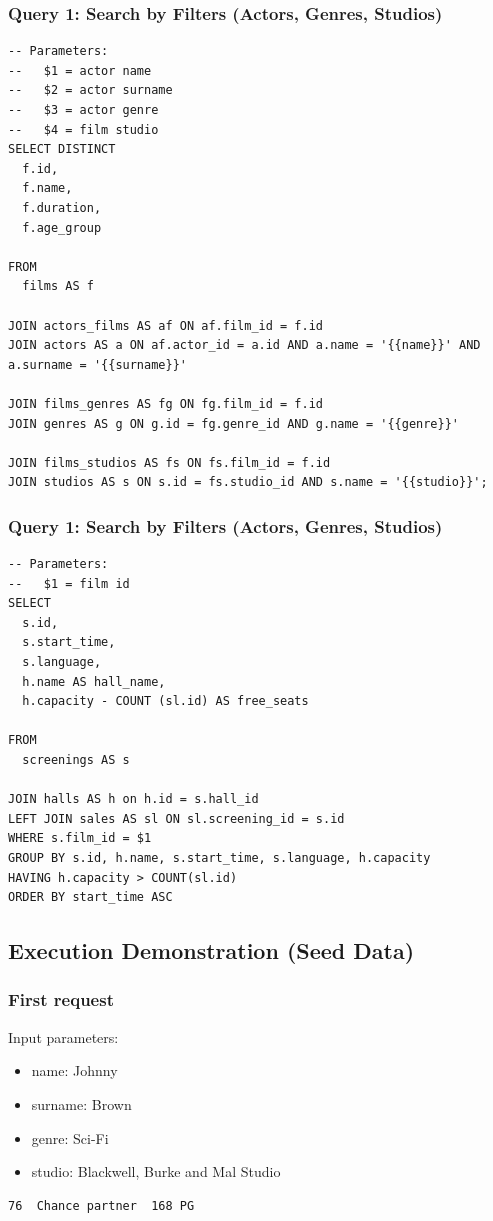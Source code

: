 \documentclass[11pt, a4paper]{article}
\begin{document}
\subsubsection{Query 1: Search by Filters (Actors, Genres, Studios)}
\begin{lstlisting}
-- Parameters:
--   $1 = actor name
--   $2 = actor surname
--   $3 = actor genre
--   $4 = film studio
SELECT DISTINCT
  f.id,
  f.name,
  f.duration,
  f.age_group

FROM
  films AS f

JOIN actors_films AS af ON af.film_id = f.id
JOIN actors AS a ON af.actor_id = a.id AND a.name = '{{name}}' AND a.surname = '{{surname}}'

JOIN films_genres AS fg ON fg.film_id = f.id
JOIN genres AS g ON g.id = fg.genre_id AND g.name = '{{genre}}'

JOIN films_studios AS fs ON fs.film_id = f.id
JOIN studios AS s ON s.id = fs.studio_id AND s.name = '{{studio}}';
\end{lstlisting}

\subsubsection{Query 1: Search by Filters (Actors, Genres, Studios)}
\begin{lstlisting}
-- Parameters:
--   $1 = film id
SELECT
  s.id,
  s.start_time,
  s.language,
  h.name AS hall_name,
  h.capacity - COUNT (sl.id) AS free_seats

FROM
  screenings AS s

JOIN halls AS h on h.id = s.hall_id
LEFT JOIN sales AS sl ON sl.screening_id = s.id
WHERE s.film_id = $1
GROUP BY s.id, h.name, s.start_time, s.language, h.capacity
HAVING h.capacity > COUNT(sl.id)
ORDER BY start_time ASC
\end{lstlisting}

\subsection{Execution Demonstration (Seed Data)}
\subsubsection{First request}
Input parameters:
\begin{itemize}
    \item name: Johnny
    \item surname: Brown
    \item genre: Sci-Fi
    \item studio: Blackwell, Burke and Mal Studio
\end{itemize}
\begin{lstlisting}
76	Chance partner	168	PG
\end{lstlisting}
\end{document}
